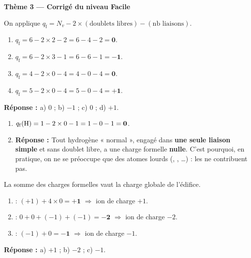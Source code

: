 \documentclass[11pt,a4paper]{article}
\newcommand{\rep}{\textbf{\textcolor{corcol}{Réponse : }}}
\begin{document}
\begin{center}
{\Large\bfseries\color{primarydark}Thème 3 — Corrigé du niveau Facile}
\end{center}
\medskip

\begin{cor}
On applique $q_{\mathrm{f}} = N_v - 2\times(\text{doublets libres}) - (\text{nb liaisons})$.
\begin{enumerate}[label=\alph*),leftmargin=2em,itemsep=2pt]
  \item $q_{\mathrm{f}} = 6 - 2\times 2 - 2 = 6 - 4 - 2 = \mathbf{0}$.
  \item $q_{\mathrm{f}} = 6 - 2\times 3 - 1 = 6 - 6 - 1 = \mathbf{-1}$.
  \item $q_{\mathrm{f}} = 4 - 2\times 0 - 4 = 4 - 0 - 4 = \mathbf{0}$.
  \item $q_{\mathrm{f}} = 5 - 2\times 0 - 4 = 5 - 0 - 4 = \mathbf{+1}$.
\end{enumerate}
\rep a) $0$ ; \; b) $-1$ ; \; c) $0$ ; \; d) $+1$.
\end{cor}

\begin{cor}
\begin{enumerate}[label=\alph*),leftmargin=2em,itemsep=2pt]
  \item $q_{\mathrm{f}}(\ce{H}) = 1 - 2\times 0 - 1 = 1 - 0 - 1 = \mathbf{0}$.
  \item \rep Tout hydrogène « normal », engagé dans \textbf{une seule liaison simple} et sans
        doublet libre, a une charge formelle \textbf{nulle}. C'est pourquoi, en pratique, on ne se
        préoccupe que des atomes lourds (, , \ldots) : les  ne contribuent pas.
\end{enumerate}
\end{cor}

\begin{cor}
La somme des charges formelles vaut la charge globale de l'édifice.
\begin{enumerate}[label=\alph*),leftmargin=2em,itemsep=2pt]
  \item {} : $(+1) + 4\times 0 = \mathbf{+1}$ \; $\Rightarrow$ ion de charge $+1$. \checkmark
  \item {} : $0 + 0 + (-1) + (-1) = \mathbf{-2}$ \; $\Rightarrow$ ion de charge $-2$. \checkmark
  \item {} : $(-1) + 0 = \mathbf{-1}$ \; $\Rightarrow$ ion de charge $-1$. \checkmark
\end{enumerate}
\rep a) $+1$ ; \; b) $-2$ ; \; c) $-1$.
\end{cor}
\end{document}
